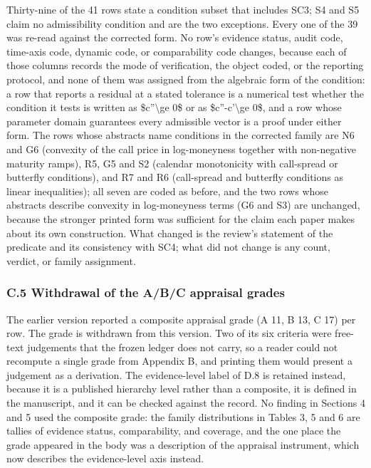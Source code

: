 \documentclass[11pt]{article}
\begin{document}
Thirty-nine of the 41 rows state a condition subset that includes SC3; S4 and S5 claim no admissibility condition and are the two exceptions. Every one of the 39 was re-read against the corrected form. No row's evidence status, audit code, time-axis code, dynamic code, or comparability code changes, because each of those columns records the mode of verification, the object coded, or the reporting protocol, and none of them was assigned from the algebraic form of the condition: a row that reports a residual at a stated tolerance is a numerical test whether the condition it tests is written as \$c''\textbackslash{}ge 0\$ or as \$c''-c'\textbackslash{}ge 0\$, and a row whose parameter domain guarantees every admissible vector is a proof under either form. The rows whose abstracts name conditions in the corrected family are N6 and G6 (convexity of the call price in log-moneyness together with non-negative maturity ramps), R5, G5 and S2 (calendar monotonicity with call-spread or butterfly conditions), and R7 and R6 (call-spread and butterfly conditions as linear inequalities); all seven are coded as before, and the two rows whose abstracts describe convexity in log-moneyness terms (G6 and S3) are unchanged, because the stronger printed form was sufficient for the claim each paper makes about its own construction. What changed is the review's statement of the predicate and its consistency with SC4; what did not change is any count, verdict, or family assignment.

\subsubsection*{C.5 Withdrawal of the A/B/C appraisal grades}
The earlier version reported a composite appraisal grade (A 11, B 13, C 17) per row. The grade is withdrawn from this version. Two of its six criteria were free-text judgements that the frozen ledger does not carry, so a reader could not recompute a single grade from Appendix B, and printing them would present a judgement as a derivation. The evidence-level label of D.8 is retained instead, because it is a published hierarchy level rather than a composite, it is defined in the manuscript, and it can be checked against the record. No finding in Sections 4 and 5 used the composite grade: the family distributions in Tables 3, 5 and 6 are tallies of evidence status, comparability, and coverage, and the one place the grade appeared in the body was a description of the appraisal instrument, which now describes the evidence-level axis instead.
\end{document}
